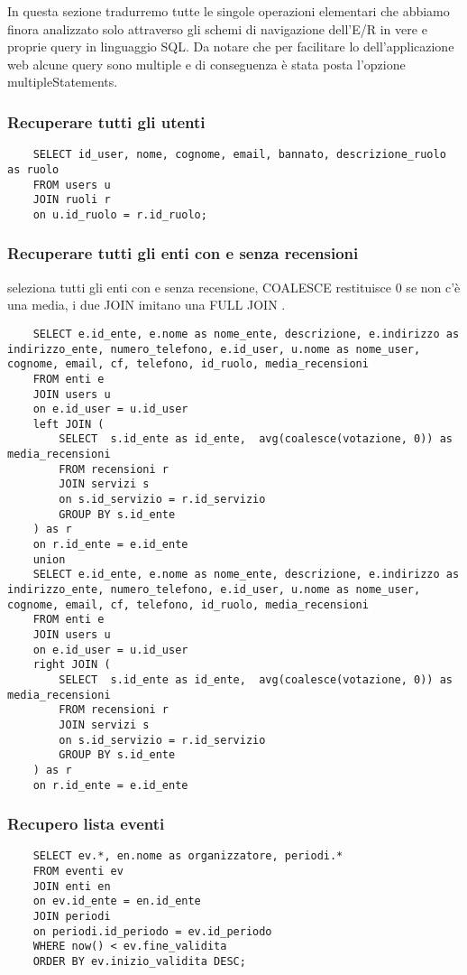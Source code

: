 In questa sezione tradurremo tutte le singole operazioni elementari che abbiamo finora analizzato solo
attraverso gli schemi di navigazione dell’E/R in vere e proprie query in linguaggio SQL. 
Da notare che per facilitare lo dell'applicazione web alcune query sono multiple e di conseguenza è stata posta l'opzione multipleStatements.


\subsubsection{Recuperare tutti gli utenti}

\begin{lstlisting}
    SELECT id_user, nome, cognome, email, bannato, descrizione_ruolo as ruolo
    FROM users u
    JOIN ruoli r 
    on u.id_ruolo = r.id_ruolo;
\end{lstlisting}

\subsubsection{Recuperare tutti gli enti con e senza recensioni}
seleziona tutti gli enti con e senza recensione, COALESCE restituisce 0 se non c'è una media, i due JOIN imitano una FULL JOIN .
\begin{lstlisting}
    SELECT e.id_ente, e.nome as nome_ente, descrizione, e.indirizzo as indirizzo_ente, numero_telefono, e.id_user, u.nome as nome_user, cognome, email, cf, telefono, id_ruolo, media_recensioni
    FROM enti e
    JOIN users u
    on e.id_user = u.id_user
    left JOIN (
        SELECT  s.id_ente as id_ente,  avg(coalesce(votazione, 0)) as media_recensioni
        FROM recensioni r
        JOIN servizi s
        on s.id_servizio = r.id_servizio
        GROUP BY s.id_ente
    ) as r
    on r.id_ente = e.id_ente 
    union
    SELECT e.id_ente, e.nome as nome_ente, descrizione, e.indirizzo as indirizzo_ente, numero_telefono, e.id_user, u.nome as nome_user, cognome, email, cf, telefono, id_ruolo, media_recensioni
    FROM enti e
    JOIN users u
    on e.id_user = u.id_user
    right JOIN (
        SELECT  s.id_ente as id_ente,  avg(coalesce(votazione, 0)) as media_recensioni
        FROM recensioni r
        JOIN servizi s
        on s.id_servizio = r.id_servizio
        GROUP BY s.id_ente
    ) as r
    on r.id_ente = e.id_ente
\end{lstlisting}


\subsubsection{Recupero lista eventi}
\begin{lstlisting}
    SELECT ev.*, en.nome as organizzatore, periodi.*
    FROM eventi ev
    JOIN enti en
    on ev.id_ente = en.id_ente
    JOIN periodi
    on periodi.id_periodo = ev.id_periodo
    WHERE now() < ev.fine_validita
    ORDER BY ev.inizio_validita DESC;
\end{lstlisting}

